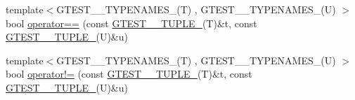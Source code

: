 \begin{DoxyCompactItemize}
\item 
{\footnotesize template$<$G\-T\-E\-S\-T\-\_\-\_\-\-T\-Y\-P\-E\-N\-A\-M\-E\-S\-\_\-(\-T) , G\-T\-E\-S\-T\-\_\-\_\-\-T\-Y\-P\-E\-N\-A\-M\-E\-S\-\_\-(\-U) $>$ }\\bool \hyperlink{namespacestd_1_1tr1_af4516de784404381f9b14797694b6311}{operator==} (const \hyperlink{namespacestd_1_1tr1_aa636d3269bf1f368a7bc09ff158bc482}{G\-T\-E\-S\-T\-\_\-\_\-\-T\-U\-P\-L\-E\-\_\-}(T)\&t, const \hyperlink{namespacestd_1_1tr1_aa636d3269bf1f368a7bc09ff158bc482}{G\-T\-E\-S\-T\-\_\-\_\-\-T\-U\-P\-L\-E\-\_\-}(U)\&u)
\item 
{\footnotesize template$<$G\-T\-E\-S\-T\-\_\-\_\-\-T\-Y\-P\-E\-N\-A\-M\-E\-S\-\_\-(\-T) , G\-T\-E\-S\-T\-\_\-\_\-\-T\-Y\-P\-E\-N\-A\-M\-E\-S\-\_\-(\-U) $>$ }\\bool \hyperlink{namespacestd_1_1tr1_a058882c51de469b5e78d29076f864940}{operator!=} (const \hyperlink{namespacestd_1_1tr1_aa636d3269bf1f368a7bc09ff158bc482}{G\-T\-E\-S\-T\-\_\-\_\-\-T\-U\-P\-L\-E\-\_\-}(T)\&t, const \hyperlink{namespacestd_1_1tr1_aa636d3269bf1f368a7bc09ff158bc482}{G\-T\-E\-S\-T\-\_\-\_\-\-T\-U\-P\-L\-E\-\_\-}(U)\&u)
\end{DoxyCompactItemize}
